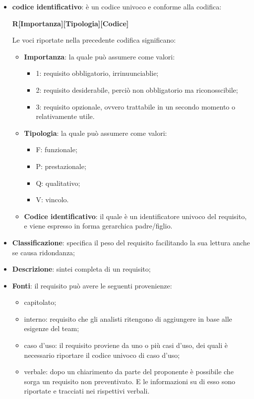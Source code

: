 				\begin{itemize}
					\item \textbf{codice identificativo}: è un codice univoco e conforme alla codifica: \newline \newline
					\centerline{\textbf{R[Importanza][Tipologia][Codice]}} \newline \newline
					Le voci riportate nella precedente codifica significano: 
					\begin{itemize}
						\item \textbf{Importanza}: la quale può assumere come valori:
						\begin{itemize}
							\item 1: requisito obbligatorio, irrinuunciablie;
							\item 2: requisito desiderabile, perciò non obbligatorio ma riconosscibile;
							\item 3: requisito opzionale, ovvero trattabile in un secondo momento o relativamente utile.
						\end{itemize}
						\item \textbf{Tipologia}: la quale può assumere come valori:
						\begin{itemize}
							\item F: funzionale;
							\item P: prestazionale;
							\item Q: qualitativo;
							\item V: vincolo.
						\end{itemize}
						\item \textbf{Codice identificativo}: il quale è un identificatore univoco del requisito, e viene espresso in forma gerarchica padre/figlio.
					\end{itemize}
					\item \textbf{Classificazione}: specifica il peso del requisito facilitando la sua lettura anche se causa ridondanza;
					\item \textbf{Descrizione}: sintei completa di un requisito;
					\item \textbf{Fonti}: il requisito può avere le seguenti provenienze:
					\begin{itemize}
						\item capitolato;
						\item interno: requisito che gli analisti ritengono di aggiungere in base alle esigenze del team;
						\item caso d'uso: il requisito proviene da uno o più casi d'uso, dei quali è necessario riportare il codice univoco di caso d'uso;
						\item verbale: dopo un chiarimento da parte del proponente è possibile che sorga un requisito non preventivato. E le informazioni su di esso sono riportate e tracciati nei rispettivi verbali.
					\end{itemize}
				\end{itemize} 
